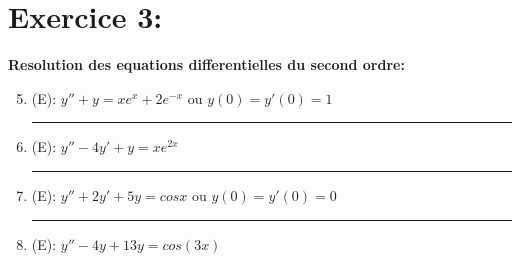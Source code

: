 \documentclass[a4paper,12pt]{article}
\begin{document}

\section*{Exercice 3:}
\textbf{Resolution des equations differentielles du second ordre:}

\begin{enumerate}
	\setcounter{enumi}{4}
	\vspace{1cm}
	\item (E): $y'' + y = xe^x + 2e^{-x}$ ou $y(0) = y'(0) = 1$ \\
	
	
	\vspace{1cm}
	\hrule
	\vspace{1cm}
	
	\item (E): $y'' - 4y' + y = xe^{2x}$ \\
	
	
	\vspace{1cm}
	\hrule
	\vspace{1cm}
	
	\item (E): $y'' + 2y' + 5y = cosx$ ou $y(0) = y'(0) = 0$\\
	
	
	\vspace{1cm}
	\hrule
	\vspace{1cm}
	
	\item (E): $y'' - 4y + 13y = cos(3x)$
	 \\
	
	\vspace{1cm}
\end{enumerate}
\end{document}
